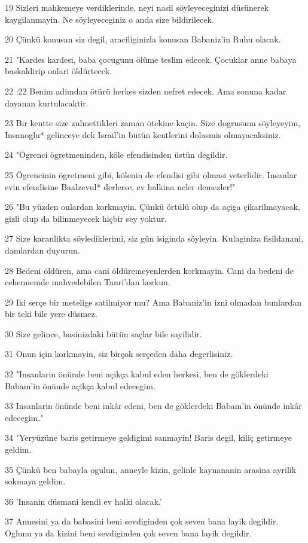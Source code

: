 \par 19 Sizleri mahkemeye verdiklerinde, neyi nasil söyleyeceginizi düsünerek kaygilanmayin. Ne söyleyeceginiz o anda size bildirilecek.
\par 20 Çünkü konusan siz degil, araciliginizla konusan Babaniz'in Ruhu olacak.
\par 21 "Kardes kardesi, baba çocugunu ölüme teslim edecek. Çocuklar anne babaya baskaldirip onlari öldürtecek.
\par 22 :22 Benim adimdan ötürü herkes sizden nefret edecek. Ama sonuna kadar dayanan kurtulacaktir.
\par 23 Bir kentte size zulmettikleri zaman ötekine kaçin. Size dogrusunu söyleyeyim, Insanoglu* gelinceye dek Israil'in bütün kentlerini dolasmis olmayacaksiniz.
\par 24 "Ögrenci ögretmeninden, köle efendisinden üstün degildir.
\par 25 Ögrencinin ögretmeni gibi, kölenin de efendisi gibi olmasi yeterlidir. Insanlar evin efendisine Baalzevul* derlerse, ev halkina neler demezler!"
\par 26 "Bu yüzden onlardan korkmayin. Çünkü örtülü olup da açiga çikarilmayacak, gizli olup da bilinmeyecek hiçbir sey yoktur.
\par 27 Size karanlikta söylediklerimi, siz gün isiginda söyleyin. Kulaginiza fisildanani, damlardan duyurun.
\par 28 Bedeni öldüren, ama cani öldüremeyenlerden korkmayin. Cani da bedeni de cehennemde mahvedebilen Tanri'dan korkun.
\par 29 Iki serçe bir metelige satilmiyor mu? Ama Babaniz'in izni olmadan bunlardan bir teki bile yere düsmez.
\par 30 Size gelince, basinizdaki bütün saçlar bile sayilidir.
\par 31 Onun için korkmayin, siz birçok serçeden daha degerlisiniz.
\par 32 "Insanlarin önünde beni açikça kabul eden herkesi, ben de göklerdeki Babam'in önünde açikça kabul edecegim.
\par 33 Insanlarin önünde beni inkâr edeni, ben de göklerdeki Babam'in önünde inkâr edecegim."
\par 34 "Yeryüzüne baris getirmeye geldigimi sanmayin! Baris degil, kiliç getirmeye geldim.
\par 35 Çünkü ben babayla ogulun, anneyle kizin, gelinle kaynananin arasina ayrilik sokmaya geldim.
\par 36 'Insanin düsmani kendi ev halki olacak.'
\par 37 Annesini ya da babasini beni sevdiginden çok seven bana layik degildir. Oglunu ya da kizini beni sevdiginden çok seven bana layik degildir.
